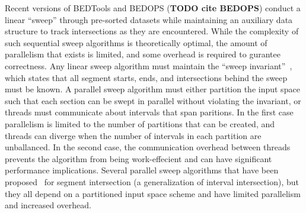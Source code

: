 \documentclass{bioinfo}
\begin{document}
	Recent versions of BEDTools and BEDOPS (\textbf{TODO cite BEDOPS}) conduct a
	linear ``sweep'' through pre-sorted datasets while maintaining an auxiliary
	data structure to track intersections as they are encountered. While the
	complexity of such sequential sweep algorithms is theoretically optimal, the 
	amount of parallelism that exists is limited, and some overhead is required to
	gurantee correctness.  Any linear sweep algorithm must maintain the ``sweep
	invariant''~\cite{mckenney2009}, which states that all segment starts, ends, 
	and intersections behind the sweep must be known.  A parallel sweep algorithm
	must either partition the input space such that each section can be swept in
	parallel without violating the invariant, or threads must communicate 
	about intervals that span paritions.  In the first case parallelism is limited
	to the number of partitions that can be created, and threads can diverge when 
	the number of intervals in each partition are unballanced.  In the second case,
	the communication overhead between threads prevents the algorithm from being 
	work-effecient and can have significant performance implications.  Several
	parallel sweep algorithms that have been proposed~\citep{goodrich1993,
	kriegel1991, mckenney2009} for segment intersection (a generalization of
	interval intersection), but they all depend on a partitioned input space scheme
	and have limited parallelism and increased overhead.


	
	
\end{document}
